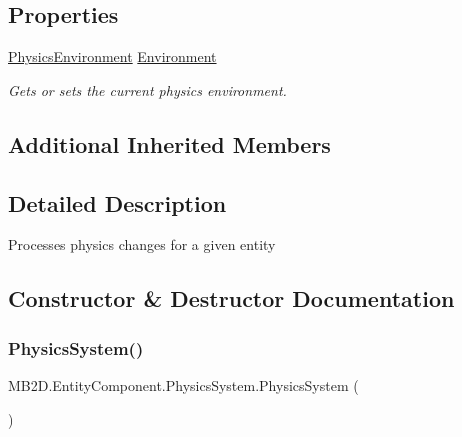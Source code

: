 \subsection*{Properties}
\begin{DoxyCompactItemize}
\item 
\hyperlink{class_m_b2_d_1_1_entity_component_1_1_physics_environment}{Physics\+Environment} \hyperlink{class_m_b2_d_1_1_entity_component_1_1_physics_system_aa3340a463c0cc2dd1c765c350352c213}{Environment}
\begin{DoxyCompactList}\small\item\em Gets or sets the current physics environment. \end{DoxyCompactList}\end{DoxyCompactItemize}
\subsection*{Additional Inherited Members}


\subsection{Detailed Description}
Processes physics changes for a given entity 



\subsection{Constructor \& Destructor Documentation}
\hypertarget{class_m_b2_d_1_1_entity_component_1_1_physics_system_a3ab72aac19449619200d2353572b28b0}{}\label{class_m_b2_d_1_1_entity_component_1_1_physics_system_a3ab72aac19449619200d2353572b28b0} 
\subsubsection{\texorpdfstring{Physics\+System()}{PhysicsSystem()}}
{\footnotesize\ttfamily M\+B2\+D.\+Entity\+Component.\+Physics\+System.\+Physics\+System (\begin{DoxyParamCaption}{ }\end{DoxyParamCaption})\hspace{0.3cm}{\ttfamily [inline]}}



